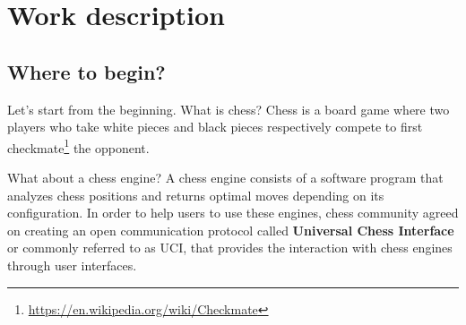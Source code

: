 \chapter{Work description}
\label{cap:descripcionTrabajo}
\renewcommand{\figurename}{Figure}






\section{Where to begin?}

Let's start from the beginning. What is chess? Chess is a board game where two players who take white pieces and black pieces respectively compete to first checkmate\footnote{\url{https://en.wikipedia.org/wiki/Checkmate}} the opponent.

What about a chess engine? A chess engine consists of a software program that analyzes chess positions and returns optimal moves depending on its configuration. In order to help users to use these engines, chess community agreed on creating an open communication protocol called \textbf{Universal Chess Interface} or commonly referred to as UCI, that provides the interaction with chess engines through user interfaces.

